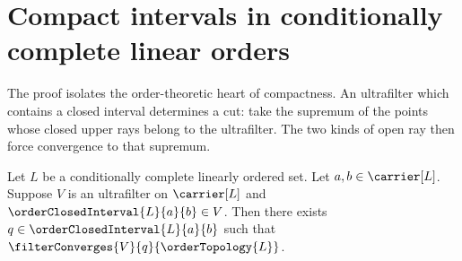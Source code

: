 \section{Compact intervals in conditionally complete linear orders}







The proof isolates the order-theoretic heart of compactness.  An ultrafilter
which contains a closed interval determines a cut: take the supremum of the
points whose closed upper rays belong to the ultrafilter.  The two kinds of
open ray then force convergence to that supremum.

\begin{theorem}\label{bounded_order_ultrafilter_converges}
    Let $L$ be a conditionally complete linearly ordered set.
    Let $a,b\in\carrier[L]$.
    Suppose $V$ is an ultrafilter on $\carrier[L]$ and
        $\orderClosedInterval{L}{a}{b}\in V$.
    Then there exists $q\in\orderClosedInterval{L}{a}{b}$ such that
        $\filterConverges{V}{q}{\orderTopology{L}}$.
\end{theorem}
